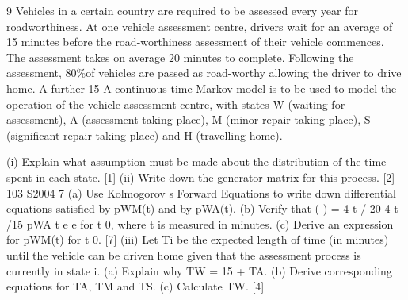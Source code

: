 \documentclass[a4paper,12pt]{article}
\begin{document}
\begin{enumerate}

9 Vehicles in a certain country are required to be assessed every year for roadworthiness. At one vehicle assessment centre, drivers wait for an average of 15
minutes before the road-worthiness assessment of their vehicle commences. The
assessment takes on average 20 minutes to complete. Following the assessment, 80\%of vehicles are passed as road-worthy allowing the driver to drive home. A further 15%
A continuous-time Markov model is to be used to model the operation of the vehicle assessment centre, with states W (waiting for assessment), A (assessment taking place), M (minor repair taking place), S (significant repair taking place) and H
(travelling home).

(i) Explain what assumption must be made about the distribution of the time
spent in each state. [1]
(ii) Write down the generator matrix for this process. [2]
103 S2004 7
(a) Use Kolmogorov s Forward Equations to write down differential
equations satisfied by pWM(t) and by pWA(t).
(b) Verify that ( ) = 4 t / 20 4 t /15
pWA t e e for t 0, where t is measured in
minutes.
(c) Derive an expression for pWM(t) for t 0.
[7]
(iii) Let Ti be the expected length of time (in minutes) until the vehicle can be
driven home given that the assessment process is currently in state i.
(a) Explain why TW = 15 + TA.
(b) Derive corresponding equations for TA, TM and TS.
(c) Calculate TW.
[4]
\newpage




\end{enumerate}
\end{document}
